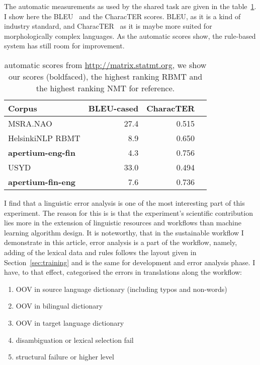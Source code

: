 \documentclass[free]{flammie}
\begin{document}
The automatic measurements as used by the shared task are given in the
table~\ref{table:bleu}. I show here the BLEU~\cite{papineni2002bleu} and the CharacTER scores.
BLEU, as it is a kind of industry standard, and CharacTER~\cite{wang2016character} as it is maybe more suited for
morphologically complex languages. As the automatic scores show, the rule-based
system has still room for improvement.

\begin{table}
\begin{center}
    \begin{tabular}{lrrr}
        \toprule
        \bf Corpus & BLEU-cased & CharacTER \\
        \midrule
        MSRA.NAO & 27.4 & 0.515 \\
        HelsinkiNLP RBMT & 8.9 & 0.650 \\
        \bf apertium-eng-fin & 4.3 & 0.756  \\
        \midrule
        USYD & 33.0 & 0.494 \\
        \bf apertium-fin-eng & 7.6 & 0.736  \\
        \bottomrule
    \end{tabular}
    \caption{automatic scores from \url{http://matrix.statmt.org}, we show our scores (boldfaced), the highest
    ranking RBMT and the highest ranking NMT for reference.\label{table:bleu}}
\end{center}
\end{table}



I find that a linguistic error analysis is one of the most interesting part of
this experiment. The reason for this is is that the experiment's scientific
contribution lies more in the extension of linguistic resources and workflows
than machine learning algorithm design. It is noteworthy, that in
the sustainable workflow I demonstrate in this article, error analysis is a
part of the workflow, namely, adding of the lexical data and rules follows the
layout given in Section~\ref{sec:training} and is the same for development and
error analysis phase. I have, to that effect, categorised the errors in
translations along the workflow:

\begin{enumerate}
    \item OOV in source language dictionary (including typos and non-words)
    \item OOV in bilingual dictionary
    \item OOV in target language dictionary
    \item disambiguation or lexical selection fail
    \item structural failure or higher level
\end{enumerate}
\end{document}
